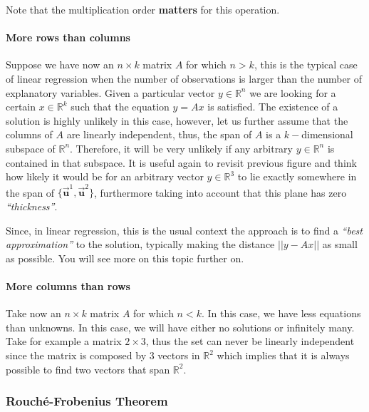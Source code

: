 \documentclass[11pt]{article}
\begin{document}
Note that the multiplication order \textbf{matters} for this operation.

\hypertarget{more-rows-than-columns}{%
\paragraph{More rows than columns}\label{more-rows-than-columns}}

Suppose we have now an \(n\times k\) matrix \(A\) for which \(n > k\),
this is the typical case of linear regression when the number of
observations is larger than the number of explanatory variables. Given a
particular vector \(y\in\mathbb{R}^n\) we are looking for a certain
\(x\in\mathbb{R}^k\) such that the equation \(y = Ax\) is satisfied. The
existence of a solution is highly unlikely in this case, however, let us
further assume that the columns of \(A\) are linearly independent, thus,
the span of \(A\) is a \(k-\)dimensional subspace of \(\mathbb{R}^n\).
Therefore, it will be very unlikely if any arbitrary
\(y\in\mathbb{R}^n\) is contained in that subspace. It is useful again
to revisit previous figure and think how likely it would be for an
arbitrary vector \(y\in\mathbb{R}^3\) to lie exactly somewhere in the
span of \(\{\vec{\mathbf{u}}^1,\vec{\mathbf{u}}^2\}\), furthermore
taking into account that this plane has zero \emph{``thickness''}.

Since, in linear regression, this is the usual context the approach is
to find a \emph{``best approximation''} to the solution, typically
making the distance \(||y - Ax||\) as small as possible. You will see
more on this topic further on.

\hypertarget{more-columns-than-rows}{%
\paragraph{More columns than rows}\label{more-columns-than-rows}}

Take now an \(n\times k\) matrix \(A\) for which \(n < k\). In this
case, we have less equations than unknowns. In this case, we will have
either no solutions or infinitely many. Take for example a matrix
\(2\times 3\), thus the set can never be linearly independent since the
matrix is composed by 3 vectors in \(\mathbb{R}^2\) which implies that
it is always possible to find two vectors that span \(\mathbb{R}^2\).

\hypertarget{rouchuxe9-frobenius-theorem}{%
\subsubsection{Rouché-Frobenius
Theorem}\label{rouchuxe9-frobenius-theorem}}
\end{document}
